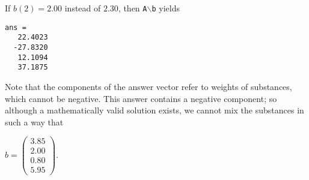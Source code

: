 \documentclass{ximera}
\begin{document}
\begin{computerExercise}
\begin{solution}
\para If $b(2) = 2.00$ instead of $2.30$, then
{\tt A}$\backslash${\tt b} yields

\begin{verbatim}
ans =
   22.4023
  -27.8320
   12.1094
   37.1875
\end{verbatim}
Note that the components of the answer vector refer to weights of
substances, which cannot be negative.  This answer contains a negative
component; so although a mathematically valid solution exists, we
cannot mix the substances in such a way that

$b = \left(\begin{array}{r} 3.85 \\ 2.00 \\ 0.80 \\ 5.95\end{array} \right)$.


\end{solution}
\end{computerExercise}
\end{document}
